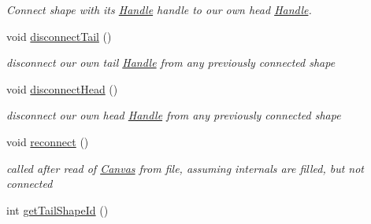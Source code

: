 \begin{DoxyCompactItemize}
\begin{DoxyCompactList}\small\item\em Connect \textquotesingle{}shape\textquotesingle{} with it\textquotesingle{}s \hyperlink{classcanvascv_1_1Handle}{Handle} \textquotesingle{}handle\textquotesingle{} to our own head \hyperlink{classcanvascv_1_1Handle}{Handle}. \end{DoxyCompactList}\item 
void \hyperlink{classcanvascv_1_1ShapesConnector_a583c55abfaccaf62f510281b56cc5059}{disconnect\+Tail} ()\hypertarget{classcanvascv_1_1ShapesConnector_a583c55abfaccaf62f510281b56cc5059}{}\label{classcanvascv_1_1ShapesConnector_a583c55abfaccaf62f510281b56cc5059}

\begin{DoxyCompactList}\small\item\em disconnect our own tail \hyperlink{classcanvascv_1_1Handle}{Handle} from any previously connected shape \end{DoxyCompactList}\item 
void \hyperlink{classcanvascv_1_1ShapesConnector_ae953fce050f2ceffa4eb2c17be416a84}{disconnect\+Head} ()\hypertarget{classcanvascv_1_1ShapesConnector_ae953fce050f2ceffa4eb2c17be416a84}{}\label{classcanvascv_1_1ShapesConnector_ae953fce050f2ceffa4eb2c17be416a84}

\begin{DoxyCompactList}\small\item\em disconnect our own head \hyperlink{classcanvascv_1_1Handle}{Handle} from any previously connected shape \end{DoxyCompactList}\item 
void \hyperlink{classcanvascv_1_1ShapesConnector_afddfa95e10779b106070a24177d9d9be}{reconnect} ()\hypertarget{classcanvascv_1_1ShapesConnector_afddfa95e10779b106070a24177d9d9be}{}\label{classcanvascv_1_1ShapesConnector_afddfa95e10779b106070a24177d9d9be}

\begin{DoxyCompactList}\small\item\em called after read of \hyperlink{classcanvascv_1_1Canvas}{Canvas} from file, assuming internals are filled, but not connected \end{DoxyCompactList}\item 
int \hyperlink{classcanvascv_1_1ShapesConnector_a977c1a582ae5fb3b17eff1eedb8cc808}{get\+Tail\+Shape\+Id} ()\hypertarget{classcanvascv_1_1ShapesConnector_a977c1a582ae5fb3b17eff1eedb8cc808}{}\label{classcanvascv_1_1ShapesConnector_a977c1a582ae5fb3b17eff1eedb8cc808}


\end{DoxyCompactItemize}
